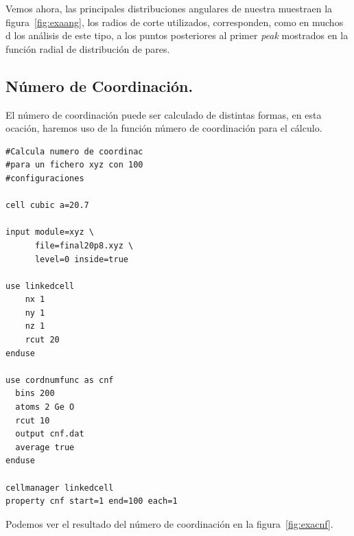 Vemos ahora, las principales distribuciones angulares de nuestra muestraen la figura~\ref{fig:exaang}, los radios de corte utilizados, corresponden, como en muchos d los an\'alisis de este tipo, a los puntos posteriores al primer \textit{peak} mostrados en la funci\'on radial de distribuci\'on de pares.


\subsection{N\'umero de Coordinaci\'on.}

El n\'umero de coordinaci\'on puede ser calculado de distintas formas, en esta ocaci\'on, haremos uso de la funci\'on n\'umero de coordinaci\'on para el c\'alculo.

\begin{multicols}{2}
\setlength{\columnseprule}{.5pt}
\begin{verbatim}
#Calcula numero de coordinac
#para un fichero xyz con 100
#configuraciones

cell cubic a=20.7

input module=xyz \
      file=final20p8.xyz \
      level=0 inside=true

use linkedcell
    nx 1
    ny 1
    nz 1
    rcut 20 
enduse

use cordnumfunc as cnf
  bins 200
  atoms 2 Ge O
  rcut 10
  output cnf.dat
  average true
enduse

cellmanager linkedcell
property cnf start=1 end=100 each=1
\end{verbatim}
\end{multicols}

Podemos ver el resultado del n\'umero de coordinaci\'on en la figura~\ref{fig:exacnf}.


% 
% 
% 
% 
% 
% 


